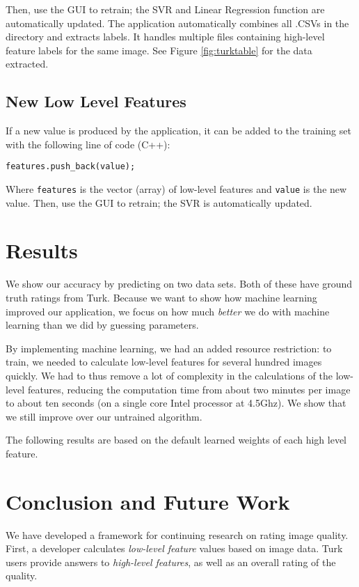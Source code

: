 \documentclass[11pt,letter]{article}
\begin{document}
Then, use the GUI to retrain; the SVR and Linear Regression function are automatically updated. The application automatically combines all .CSVs in the directory and extracts labels. It handles multiple files containing high-level feature labels for the same image. See Figure \ref{fig:turktable} for the data extracted.

\subsection{New Low Level Features}
If a new value is produced by the application, it can be added to the training set with the following line of code (C++):

\texttt{features.push\_back(value);}

Where \texttt{features} is the vector (array) of low-level features and \texttt{value} is the new value. Then, use the GUI to retrain; the SVR is automatically updated.

\section{Results}
We show our accuracy by predicting on two data sets. Both of these have ground truth ratings from Turk. Because we want to show how machine learning improved our application, we focus on how much \textit{better} we do with machine learning than we did by guessing parameters.

By implementing machine learning, we had an added resource restriction: to train, we needed to calculate low-level features for several hundred images quickly. We had to thus remove a lot of complexity in the calculations of the low-level features, reducing the computation time from about two minutes per image to about ten seconds (on a single core Intel processor at 4.5Ghz). We show that we still improve over our untrained algorithm.

The following results are based on the default learned weights of each high level feature.

\section{Conclusion and Future Work}
We have developed a framework for continuing research on rating image quality. First, a developer calculates \textit{low-level feature} values based on image data. Turk users provide answers to \textit{high-level features}, as well as an overall rating of the quality.
\end{document}
